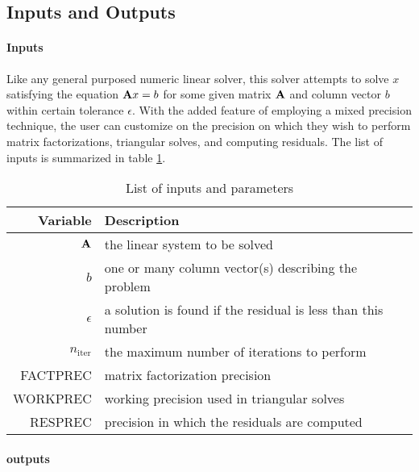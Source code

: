 \documentclass{article}
\begin{document}
\subsection{Inputs and Outputs}


\paragraph{Inputs}

Like any general purposed numeric linear solver, this solver attempts to solve
\(x\) satisfying the equation \(\mathbf{A}x = b\) for some given matrix
\(\mathbf{A}\) and column vector \(b\) within certain tolerance \(\epsilon\). With the
added feature of employing a mixed precision technique, the user can customize
on the precision on which they wish to perform matrix factorizations, triangular
solves, and computing residuals. The list of inputs is summarized in table
\ref{tab:inputs}.

\begin{table}[hp]
  \centering
  \caption{List of inputs and parameters}
  \label{tab:inputs}
  \begin{tabularx}{1.0\linewidth}{rX}
    \toprule
    \textbf{Variable}  & \textbf{Description} \\
    \midrule
    \(\mathbf{A}\) & the linear system to be solved \\
    \(b\)        & one or many column vector(s) describing the problem \\
    \(\epsilon\)        & a solution is found if the residual is less than this number \\
    \(n_\mathrm{iter}\) & the maximum number of iterations to perform \\
    FACTPREC     & matrix factorization precision \\
    WORKPREC     & working precision used in triangular solves \\
    RESPREC      & precision in which the residuals are computed \\
    \bottomrule
  \end{tabularx}
\end{table}

\paragraph{outputs}
\end{document}
